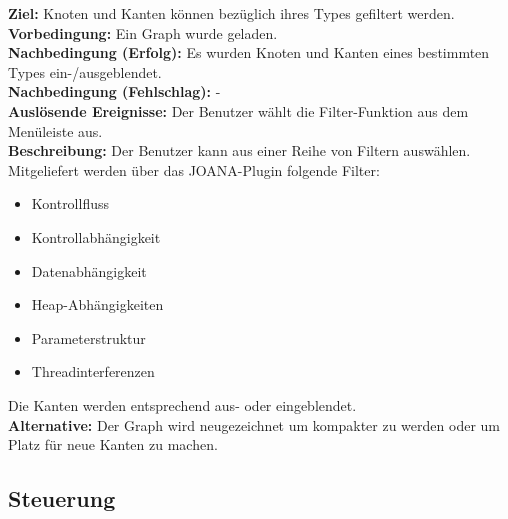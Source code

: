 \label{fa:filter}
\textbf{Ziel:} Knoten und Kanten können bezüglich ihres Types gefiltert werden.\\
\textbf{Vorbedingung:} Ein Graph wurde geladen.\\
\textbf{Nachbedingung (Erfolg):} Es wurden Knoten und Kanten eines bestimmten Types ein-/ausgeblendet.\\
\textbf{Nachbedingung (Fehlschlag):} -\\
\textbf{Auslösende Ereignisse:}
Der Benutzer wählt die Filter-Funktion aus dem Menüleiste aus.\\
\textbf{Beschreibung:}
Der Benutzer kann aus einer Reihe von Filtern auswählen.
Mitgeliefert werden über das JOANA-Plugin folgende Filter: %
\begin{itemize}[nolistsep]
  \item Kontrollfluss
  \item Kontrollabhängigkeit
  \item Datenabhängigkeit
  \item Heap-Abhängigkeiten
  \item Parameterstruktur
  \item Threadinterferenzen
\end{itemize}
Die Kanten werden entsprechend aus- oder eingeblendet.\\
\textbf{Alternative:}
Der Graph wird neugezeichnet um kompakter zu werden oder um Platz für neue Kanten zu machen.

\subsection{Steuerung}
\setcounter{fanr}{100}

